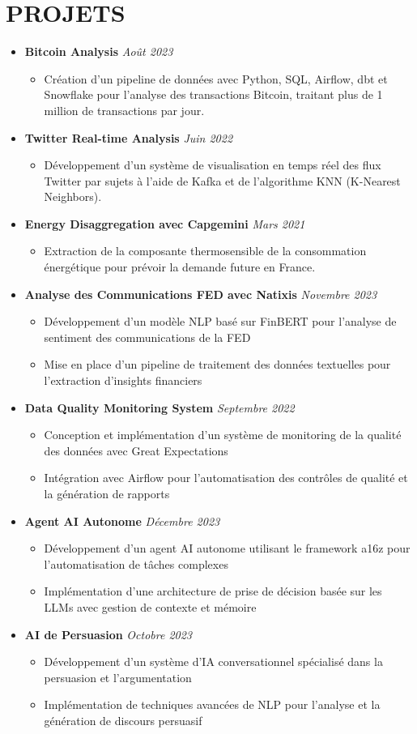 \documentclass[11pt,a4paper]{article}
\newcommand{\resumeItem}[1]{
  \item\footnotesize{
    {#1 \vspace{-1pt}}
  }
}
\newcommand{\resumeProjectHeading}[2]{
  \item
  {\footnotesize\textbf{#1}} \hfill {\footnotesize\textit{#2}}
}
\newcommand{\resumeSubHeadingListStart}{\begin{itemize}[leftmargin=0in, label={}]}
\newcommand{\resumeSubHeadingListEnd}{\end{itemize}}
\newcommand{\resumeItemListStart}{\begin{itemize}[label={\textbullet}]}
\newcommand{\resumeItemListEnd}{\end{itemize}\vspace{0pt}}
\begin{document}
\section{PROJETS}
\resumeSubHeadingListStart
    \resumeProjectHeading
      {Bitcoin Analysis} {Août 2023}
      \resumeItemListStart
        \resumeItem{Création d'un pipeline de données avec Python, SQL, Airflow, dbt et Snowflake pour l'analyse des transactions Bitcoin, traitant plus de 1 million de transactions par jour.}
      \resumeItemListEnd
    \resumeProjectHeading
      {Twitter Real-time Analysis} {Juin 2022}
      \resumeItemListStart
        \resumeItem{Développement d'un système de visualisation en temps réel des flux Twitter par sujets à l'aide de Kafka et de l'algorithme KNN (K-Nearest Neighbors).}
      \resumeItemListEnd
    \resumeProjectHeading
      {Energy Disaggregation avec Capgemini} {Mars 2021}
      \resumeItemListStart
        \resumeItem{Extraction de la composante thermosensible de la consommation énergétique pour prévoir la demande future en France.}
      \resumeItemListEnd
    \resumeProjectHeading
      {Analyse des Communications FED avec Natixis} {Novembre 2023}
      \resumeItemListStart
        \resumeItem{Développement d'un modèle NLP basé sur FinBERT pour l'analyse de sentiment des communications de la FED}
        \resumeItem{Mise en place d'un pipeline de traitement des données textuelles pour l'extraction d'insights financiers}
      \resumeItemListEnd
    \resumeProjectHeading
      {Data Quality Monitoring System} {Septembre 2022}
      \resumeItemListStart
        \resumeItem{Conception et implémentation d'un système de monitoring de la qualité des données avec Great Expectations}
        \resumeItem{Intégration avec Airflow pour l'automatisation des contrôles de qualité et la génération de rapports}
      \resumeItemListEnd
    \resumeProjectHeading
      {Agent AI Autonome} {Décembre 2023}
      \resumeItemListStart
        \resumeItem{Développement d'un agent AI autonome utilisant le framework a16z pour l'automatisation de tâches complexes}
        \resumeItem{Implémentation d'une architecture de prise de décision basée sur les LLMs avec gestion de contexte et mémoire}
      \resumeItemListEnd
    \resumeProjectHeading
      {AI de Persuasion} {Octobre 2023}
      \resumeItemListStart
        \resumeItem{Développement d'un système d'IA conversationnel spécialisé dans la persuasion et l'argumentation}
        \resumeItem{Implémentation de techniques avancées de NLP pour l'analyse et la génération de discours persuasif}
      \resumeItemListEnd
\resumeSubHeadingListEnd
\end{document}
